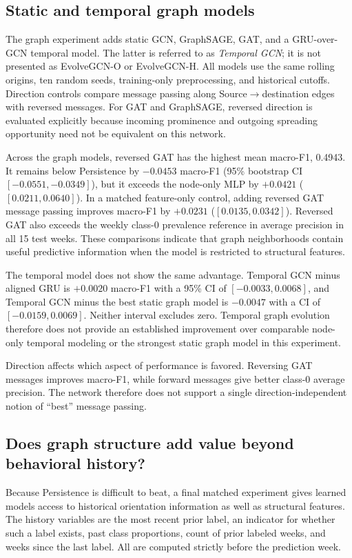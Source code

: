 \documentclass[11pt,a4paper]{article}
\begin{document}
\subsection{Static and temporal graph models}
The graph experiment adds static GCN, GraphSAGE, GAT, and a GRU-over-GCN temporal model. The latter is referred to as \emph{Temporal GCN}; it is not presented as EvolveGCN-O or EvolveGCN-H. All models use the same rolling origins, ten random seeds, training-only preprocessing, and historical cutoffs. Direction controls compare message passing along Source$\rightarrow$destination edges with reversed messages. For GAT and GraphSAGE, reversed direction is evaluated explicitly because incoming prominence and outgoing spreading opportunity need not be equivalent on this network.

Across the graph models, reversed GAT has the highest mean macro-F1, 0.4943. It remains below Persistence by $-0.0453$ macro-F1 (95\% bootstrap CI $[-0.0551,-0.0349]$), but it exceeds the node-only MLP by $+0.0421$ ($[0.0211,0.0640]$). In a matched feature-only control, adding reversed GAT message passing improves macro-F1 by $+0.0231$ ($[0.0135,0.0342]$). Reversed GAT also exceeds the weekly class-0 prevalence reference in average precision in all 15 test weeks. These comparisons indicate that graph neighborhoods contain useful predictive information when the model is restricted to structural features.

The temporal model does not show the same advantage. Temporal GCN minus aligned GRU is $+0.0020$ macro-F1 with a 95\% CI of $[-0.0033,0.0068]$, and Temporal GCN minus the best static graph model is $-0.0047$ with a CI of $[-0.0159,0.0069]$. Neither interval excludes zero. Temporal graph evolution therefore does not provide an established improvement over comparable node-only temporal modeling or the strongest static graph model in this experiment.

Direction affects which aspect of performance is favored. Reversing GAT messages improves macro-F1, while forward messages give better class-0 average precision. The network therefore does not support a single direction-independent notion of ``best'' message passing.

\subsection{Does graph structure add value beyond behavioral history?}
Because Persistence is difficult to beat, a final matched experiment gives learned models access to historical orientation information as well as structural features. The history variables are the most recent prior label, an indicator for whether such a label exists, past class proportions, count of prior labeled weeks, and weeks since the last label. All are computed strictly before the prediction week.
\end{document}
